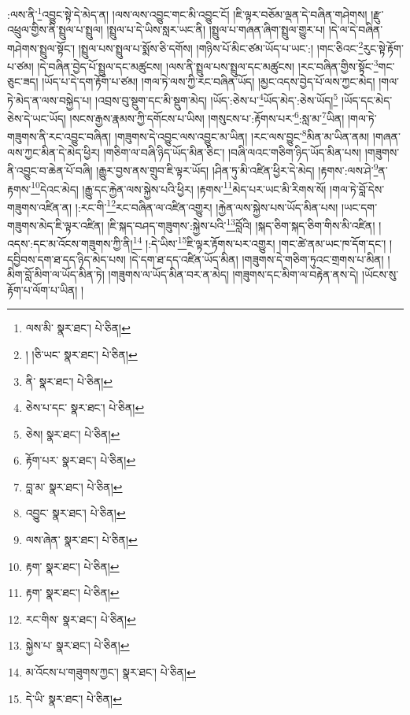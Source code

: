 :ལས་ནི་\footnote{ལས་མི་  སྣར་ཐང་།  པེ་ཅིན། }འབྱུང་སྟེ་དེ་མེད་ན། །ལས་ལས་འབྱུང་གང་མི་འབྱུང་ངོ། །ཇི་ལྟར་བཅོམ་ལྡན་དེ་བཞིན་གཤེགས། །རྫུ་འཕྲུལ་གྱིས་ནི་སྤྲུལ་པ་སྤྲུལ། །སྤྲུལ་པ་དེ་ཡིས་སླར་ཡང་ནི། །སྤྲུལ་པ་གཞན་ཞིག་སྤྲུལ་གྱུར་པ། །དེ་ལ་དེ་བཞིན་གཤེགས་སྤྲུལ་སྟོང་། །སྤྲུལ་པས་སྤྲུལ་པ་སྨོས་ཅི་དགོས། །གཉིས་པོ་མིང་ཙམ་ཡོད་པ་ཡང་:། །གང་ཅིའང་\footnote{། །ཅི་ཡང་  སྣར་ཐང་།  པེ་ཅིན། }རུང་སྟེ་རྟོག་པ་ཙམ། །དེ་བཞིན་བྱེད་པོ་སྤྲུལ་དང་མཚུངས། །ལས་ནི་སྤྲུལ་པས་སྤྲུལ་དང་མཚུངས། །རང་བཞིན་གྱིས་སྟོང་\footnote{ནི་  སྣར་ཐང་།  པེ་ཅིན། }གང་ཅུང་ཟད། །ཡོད་པ་དེ་དག་རྟོག་པ་ཙམ། །གལ་ཏེ་ལས་ཀྱི་རང་བཞིན་ཡོད། །མྱང་འདས་བྱེད་པོ་ལས་ཀྱང་མེད། །གལ་ཏེ་མེད་ན་ལས་བསྐྱེད་པ། །འབྲས་བུ་སྡུག་དང་མི་སྡུག་མེད། །ཡོད་:ཅེས་པ་\footnote{ཅེས་པ་དང་  སྣར་ཐང་།  པེ་ཅིན། }ཡོད་མེད་:ཅེས་ཡོད།\footnote{ཅེས།  སྣར་ཐང་།  པེ་ཅིན། } །ཡོད་དང་མེད་ཅེས་དེ་ཡང་ཡོད། །སངས་རྒྱས་རྣམས་ཀྱི་དགོངས་པ་ཡིས། །གསུངས་པ་:རྟོགས་པར་\footnote{རྟོག་པར་  སྣར་ཐང་།  པེ་ཅིན། }:སླ་མ་\footnote{བླ་མ་  སྣར་ཐང་།  པེ་ཅིན། }ཡིན། །གལ་ཏེ་གཟུགས་ནི་རང་འབྱུང་བཞིན། །གཟུགས་དེ་འབྱུང་ལས་འབྱུང་མ་ཡིན། །རང་ལས་བྱུང་\footnote{འབྱུང་  སྣར་ཐང་།  པེ་ཅིན། }མིན་མ་ཡིན་ནམ། །གཞན་ལས་ཀྱང་མིན་དེ་མེད་ཕྱིར། །གཅིག་ལ་བཞི་ཉིད་ཡོད་མིན་ཅིང་། །བཞི་ལའང་གཅིག་ཉིད་ཡོད་མིན་པས། །གཟུགས་ནི་འབྱུང་བ་ཆེན་པོ་བཞི། །རྒྱུར་བྱས་ནས་གྲུབ་ཇི་ལྟར་ཡོད། །ཤིན་ཏུ་མི་འཛིན་ཕྱིར་དེ་མེད། །རྟགས་:ལས་ཤེ་\footnote{ལས་ཞེན་  སྣར་ཐང་།  པེ་ཅིན། }ན་རྟགས་\footnote{རྟག་  སྣར་ཐང་།  པེ་ཅིན། }དེའང་མེད། །རྒྱུ་དང་རྐྱེན་ལས་སྐྱེས་པའི་ཕྱིར། །རྟགས་\footnote{རྟག་  སྣར་ཐང་།  པེ་ཅིན། }མེད་པར་ཡང་མི་རིགས་སོ། །གལ་ཏེ་བློ་དེས་གཟུགས་འཛིན་ན། །:རང་གི་\footnote{རང་གིས་  སྣར་ཐང་།  པེ་ཅིན། }རང་བཞིན་ལ་འཛིན་འགྱུར། །རྐྱེན་ལས་སྐྱེས་པས་ཡོད་མིན་པས། །ཡང་དག་གཟུགས་མེད་ཇི་ལྟར་འཛིན། །ཇི་སྐད་བཤད་གཟུགས་:སྐྱེས་པའི་\footnote{སྐྱེས་པ་  སྣར་ཐང་།  པེ་ཅིན། }བློའི། །སྐད་ཅིག་སྐད་ཅིག་གིས་མི་འཛིན། །འདས་:དང་མ་འོངས་གཟུགས་ཀྱི་ནི།\footnote{མ་འོངས་པ་གཟུགས་ཀྱང་།  སྣར་ཐང་།  པེ་ཅིན། } །:དེ་ཡིས་\footnote{དེ་ཡི་  སྣར་ཐང་།  པེ་ཅིན། }ཇི་ལྟར་རྟོགས་པར་འགྱུར། །གང་ཚེ་ནམ་ཡང་ཁ་དོག་དང་། །དབྱིབས་དག་ཐ་དད་ཉིད་མེད་པས། །དེ་དག་ཐ་དད་འཛིན་ཡོད་མིན། །གཟུགས་དེ་གཅིག་ཏུའང་གྲགས་པ་མིན། །མིག་བློ་མིག་ལ་ཡོད་མིན་ཏེ། །གཟུགས་ལ་ཡོད་མིན་བར་ན་མེད། །གཟུགས་དང་མིག་ལ་བརྟེན་ནས་དེ། །ཡོངས་སུ་རྟོག་པ་ལོག་པ་ཡིན། །
